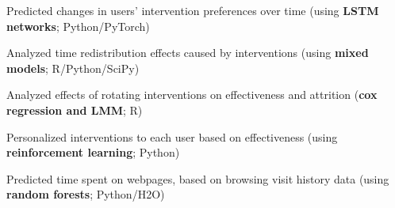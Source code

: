 \documentclass[margin,line]{resume}
\begin{document}
\begin{resume}
\begin{compactitem}
\item Predicted changes in users' intervention preferences over time (using \textbf{LSTM networks}; Python/PyTorch)
\item Analyzed time redistribution effects caused by interventions (using \textbf{mixed models}; R/Python/SciPy)
\item Analyzed effects of rotating interventions on effectiveness and attrition (\textbf{cox regression and LMM}; R)
\item Personalized interventions to each user based on effectiveness (using \textbf{reinforcement learning}; Python)
\item Predicted time spent on webpages, based on browsing visit history data (using \textbf{random forests}; Python/H2O)
\end{compactitem}






\end{resume}
\end{document}
